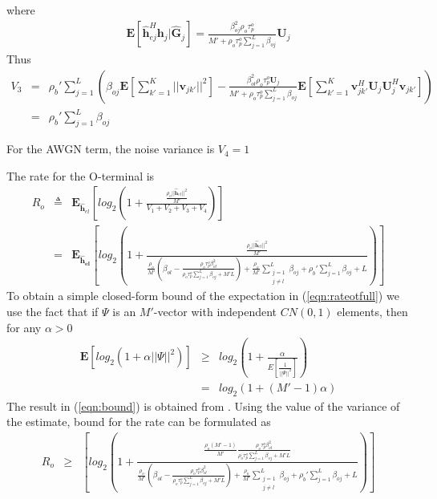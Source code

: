 \documentclass[10pt, a4paper, twoside,fleqn]{article}
\begin{document}
where
\begin{eqnarray}
	\pmb{E}[\pmb{\hat h}_{ej}^H \pmb{h}_j| \pmb{\hat G}_{j}] = \frac{\beta_{oj}^{2}\rho_o\tau_p^o}{M'+\rho_o\tau_p^o\sum\limits_{j=1}^{L}\beta_{oj}}\pmb{U}_j
\end{eqnarray}
Thus
\begin{eqnarray}\label{eqn:otv3}
	V_3 &=& \rho_b' \sum_{j=1}^{L} \left( \beta_{oj} \pmb{E}\left[\sum_{k'=1}^{K}||\pmb{v}_{jk'}||^2\right]
					- \frac{\beta_{ol}^{2}\rho_o\tau_p^o\pmb{U}_j}{M'+\rho_o\tau_p^o\sum\limits_{j=1}^{L}\beta_{oj}} \pmb{E}\left[\sum_{k'=1}^{K} \pmb{v}_{jk'}^H \pmb{U}_j \pmb{U}_j^H \pmb{v}_{jk'}\right]\right) \nonumber \\
	    &=& \rho_b'\sum_{j=1}^{L}\beta_{oj}
\end{eqnarray}

For the AWGN term, the noise variance is $V_4 = 1$

The rate for the O-terminal is
\begin{eqnarray}\label{eqn:rateotfull}
	R_o &\triangleq& \pmb{E}_{\pmb{\hat h}_{el}}\left[log_2\left(1+\frac{\frac{\rho_o||\pmb{\hat h}_{el}||^2}{M'}}{V_1+V_2+V_3+V_4}\right) \right] \nonumber \\
            &=&  \pmb{E_{\hat h_{el}}}\left[log_2\left(1+\frac{\frac{\rho_o||\pmb{\hat h}_{el}||^2}{M'}}
								 {\frac{\rho_o}{M'}(\beta_{ol}-\frac{\rho_o\tau_p^o\beta^2_{ol}}{\rho_o\tau_p^o\sum_{j=1}^{L}\beta_{oj}+M'L})        
								  + \frac{\rho_o}{M'} \sum_{\substack{j=1 \\ j\neq l}}^{L} \beta_{oj} 
								  +\rho_b'\sum_{j=1}^{L}\beta_{oj}
								  +L}\right) \right]	
\end{eqnarray}
To obtain a simple closed-form bound of the expectation in (\ref{eqn:rateotfull}) we use the fact that if $\Psi$ is an $M'$-vector with independent $CN(0,1)$ elements, then for any $\alpha>0$
\begin{eqnarray}\label{eqn:bound}
	\pmb{E}[log_2(1+\alpha||\Psi||^2)] &\geq& log_2\left(1+\frac{\alpha}{E[\frac{1}{||\Psi||^2}]}\right) \nonumber \\
                                              &=&  log_2(1+(M'-1)\alpha)
\end{eqnarray}
The result in (\ref{eqn:bound}) is obtained from \cite{bib:dtsysBook}. Using the value of the variance of the estimate, bound for the rate can be formulated as
\begin{eqnarray}
	R_o &\geq& \left[log_2\left(1+\frac{\frac{\rho_o(M'-1)}{M'}\frac{\rho_o\tau_p^o\beta^2_{ol}}{\rho_o\tau_p^o\sum\limits_{j=1}^{L}\beta_{oj}+M'L}}
								 {\frac{\rho_o}{M'}(\beta_{ol}-\frac{\rho_o\tau_p^o\beta^2_{ol}}{\rho_o\tau_p^o\sum\limits_{j=1}^{L}\beta_{oj}+M'L})        
								  + \frac{\rho_o}{M'} \sum\limits_{\substack{j=1 \\ j\neq l}}^{L} \beta_{oj} 
								  +\rho_b'\sum\limits_{j=1}^{L}\beta_{oj}
								  +L}\right) \right]	
\end{eqnarray}
\end{document}
